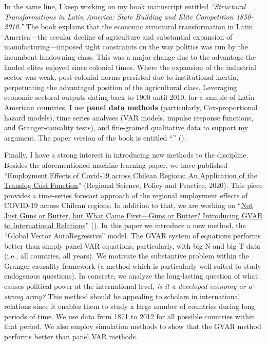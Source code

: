 \documentclass[10pt,stdletter,dateno,sigleft]{newlfm} %
\begin{document}
\begin{newlfm}
In the same line, I keep working on my book manuscript entitled \emph{``Structural Transformations in Latin America: State Building and Elite Competition 1850-2010.''} The book explains that the economic structural transformation in Latin America---the secular decline of agriculture and substantial expansion of manufacturing---imposed tight constraints on the way politics was run by the incumbent landowning class. This was a major change due to the advantage the landed elites enjoyed since colonial times. Where the expansion of the industrial sector was weak, post-colonial norms persisted due to institutional inertia, perpetuating the advantaged position of the agricultural class. Leveraging economic sectoral outputs dating back to 1900 until 2010, for a sample of Latin American countries, I use {\bf panel data methods} (particularly, Cox-proportional hazard models), time series analyses (VAR models, impulse response functions, and Granger-causality tests), and fine-grained qualitative data to support my argument. The paper version of the book is entitled ``\href{https://github.com/hbahamonde/Earthquake_Paper/raw/master/Bahamonde_Earthquake_Paper.pdf}{{\unskip}}'' (\emph{\unskip}).

Finally, I have a strong interest in introducing new methods to the discipline. Besides the aforementioned machine learning paper, we have published ``\href{https://doi.org/10.1111/rsp3.12337}{Employment Effects of Covid‐19 across Chilean Regions: An Application of the Translog Cost Function}'' (Regional Science, Policy and Practice, 2020).  This piece provides a time-series forecast approach of the regional employment effects of COVID-19 across Chilean regions. In addition to that, we are working on ``\href{https://github.com/hbahamonde/Bahamonde_Kovac/raw/master/abstract.txt}{Not Just Guns or Butter, but What Came First---Guns or Butter? Introducing GVAR to International Relations}'' (\emph{\unskip}). In this paper we introduce a new method, the ``Global Vector AutoRegressive'' model. The GVAR system of equations performs better than simply panel VAR equations, particularly, with big-N and big-T data (i.e., all countries, all years). We motivate the substantive problem within the Granger-causality framework (a method which is particularly well suited to study endogenous questions). In concrete, we analyze the long-lasting question of what causes political power at the international level, \emph{is it a developed economy or a strong army?} This method should be appealing to scholars in international relations since it enables them to study a large number of countries during long periods of time. We use data from 1871 to 2012 for all possible countries within that period. We also employ simulation methods to show that the GVAR method performs better than panel VAR methods. 


\end{newlfm}
\end{document}
